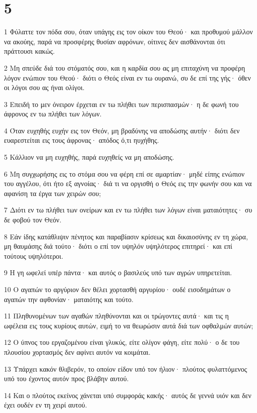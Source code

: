 \chapter{5}

\par 1 Φύλαττε τον πόδα σου, όταν υπάγης εις τον οίκον του Θεού· και προθυμού μάλλον να ακούης, παρά να προσφέρης θυσίαν αφρόνων, οίτινες δεν αισθάνονται ότι πράττουσι κακώς.
\par 2 Μη σπεύδε διά του στόματός σου, και η καρδία σου ας μη επιταχύνη να προφέρη λόγον ενώπιον του Θεού· διότι ο Θεός είναι εν τω ουρανώ, συ δε επί της γής· όθεν οι λόγοι σου ας ήναι ολίγοι.
\par 3 Επειδή το μεν όνειρον έρχεται εν τω πλήθει των περισπασμών· η δε φωνή του άφρονος εν τω πλήθει των λόγων.
\par 4 Όταν ευχηθής ευχήν εις τον Θεόν, μη βραδύνης να αποδώσης αυτήν· διότι δεν ευαρεστείται εις τους άφρονας· απόδος ό,τι ηυχήθης.
\par 5 Κάλλιον να μη ευχηθής, παρά ευχηθείς να μη αποδώσης.
\par 6 Μη συγχωρήσης εις το στόμα σου να φέρη επί σε αμαρτίαν· μηδέ είπης ενώπιον του αγγέλου, ότι ήτο εξ αγνοίας· διά τι να οργισθή ο Θεός εις την φωνήν σου και να αφανίση τα έργα των χειρών σου;
\par 7 Διότι εν τω πλήθει των ονείρων και εν τω πλήθει των λόγων είναι ματαιότητες· συ δε φοβού τον Θεόν.
\par 8 Εάν ίδης κατάθλιψιν πένητος και παραβίασιν κρίσεως και δικαιοσύνης εν τη χώρα, μη θαυμάσης διά τούτο· διότι ο επί τον υψηλόν υψηλότερος επιτηρεί· και επί τούτους υψηλότεροι.
\par 9 Η γη ωφελεί υπέρ πάντα· και αυτός ο βασιλεύς υπό των αγρών υπηρετείται.
\par 10 Ο αγαπών το αργύριον δεν θέλει χορτασθή αργυρίου· ουδέ εισοδημάτων ο αγαπών την αφθονίαν· ματαιότης και τούτο.
\par 11 Πληθυνομένων των αγαθών πληθύνονται και οι τρώγοντες αυτά· και τις η ωφέλεια εις τους κυρίους αυτών, ειμή το να θεωρώσιν αυτά διά των οφθαλμών αυτών;
\par 12 Ο ύπνος του εργαζομένου είναι γλυκύς, είτε ολίγον φάγη, είτε πολύ· ο δε του πλουσίου χορτασμός δεν αφίνει αυτόν να κοιμάται.
\par 13 Υπάρχει κακόν θλιβερόν, το οποίον είδον υπό τον ήλιον· πλούτος φυλαττόμενος υπό του έχοντος αυτόν προς βλάβην αυτού.
\par 14 Και ο πλούτος εκείνος χάνεται υπό συμφοράς κακής· αυτός δε γεννά υιόν και δεν έχει ουδέν εν τη χειρί αυτού.
